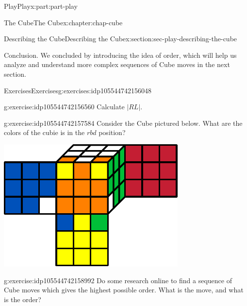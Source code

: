 \documentclass[oneside,10pt,]{book}
\numberwithin{equation}{section}
\begin{document}
\begin{partptx}{Play}{}{Play}{}{}{x:part:part-play}
\begin{chapterptx}{The Cube}{}{The Cube}{}{}{x:chapter:chap-cube}
\begin{sectionptx}{Describing the Cube}{}{Describing the Cube}{}{}{x:section:sec-play-describing-the-cube}
\begin{conclusion}{Conclusion.}
We concluded by introducing the idea of order, which will help us analyze and understand more complex sequences of Cube moves in the next section.%
\end{conclusion}%
%
%
\typeout{************************************************}
\typeout{************************************************}
%
\begin{exercises-subsection}{Exercises}{}{Exercises}{}{}{g:exercises:idp105544742156048}
\begin{divisionexercise}{1}{}{}{g:exercise:idp105544742156560}%
Calculate \(|RL|\).%
\end{divisionexercise}%
\begin{divisionexercise}{2}{}{}{g:exercise:idp105544742157584}%
Consider the Cube pictured below. What are the colors of the cubie is in the \(r bd\) position?%
\begin{image}{0.25}{0.5}{0.25}%
\includegraphics[width=\linewidth]{./images/scrambled_corners.pdf}
\end{image}%
\end{divisionexercise}%
\begin{divisionexercise}{3}{}{}{g:exercise:idp105544742158992}%
Do some research online to find a sequence of Cube moves which gives the highest possible order. What is the move, and what is the order?%
\end{divisionexercise}%
\end{exercises-subsection}
\end{sectionptx}
%
%
\typeout{************************************************}
\typeout{************************************************}

\end{chapterptx}
\end{partptx}
\end{document}
